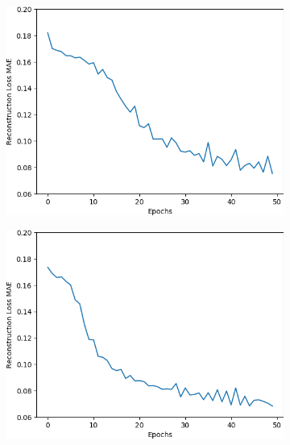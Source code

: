 \begin{figure}[H]
    \centering
    \begin{subfigure}{.25\textwidth}
        \centering
        \includegraphics[width=\textwidth]
        {images/figures/experiments_architecture/mae_graphKernel3adjusted4x4x256_dim1024.png}
        \caption{}
    \end{subfigure}%
    \begin{subfigure}{.25\textwidth}
        \centering
        \includegraphics[width=\textwidth]
        {images/figures/experiments_architecture/mae_graphKernel3adjusted8x8x128_dim1024.png}
        \caption{}
    \end{subfigure}%
    \begin{subfigure}{.25\textwidth}

\end{subfigure}
\end{figure}
